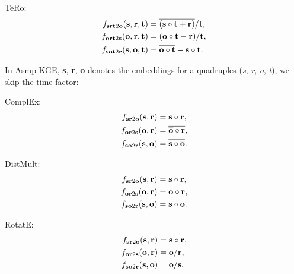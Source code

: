 \documentclass[sigconf]{acmart}
\begin{document}
\par
TeRo:
\begin{equation}
\begin{aligned}
f_{\textbf{srt} 2 \textbf{o}}(\textbf{s}, \textbf{r}, \textbf{t}) &=\overline{(\textbf{s} \circ \textbf{t} + \textbf{r})} / \textbf{t}  ,\\
f_{\textbf{ort} 2 \textbf{s}}(\textbf{o}, \textbf{r}, \textbf{t}) &=(\textbf{o} \circ \textbf{t} - \textbf{r} )/ \textbf{t}, \\
f_{\textbf{sot} 2 \textbf{r}}(\textbf{s}, \textbf{o}, \textbf{t}) &=\overline{\textbf{o} \circ \textbf{t}} - \textbf{s} \circ \textbf{t} .
\notag
\end{aligned}
\end{equation}
\par
In Asmp-KGE, \textbf{s}, \textbf{r}, \textbf{o} denotes the embeddings for a quadruples (\emph{s}, \emph{r}, \emph{o}, \emph{t}), we skip the time factor:
\par
ComplEx:
\begin{equation}
\begin{aligned}
f_{\textbf{sr} 2 \textbf{o}}(\textbf{s}, \textbf{r}) &=\textbf{s} \circ \textbf{r}, \\
f_{\textbf{or} 2 \textbf{s}}(\textbf{o}, \textbf{r}) &=\overline{\overline{\textbf{o}} \circ \textbf{r}}, \\
f_{\textbf{so} 2 \textbf{r}}(\textbf{s}, \textbf{o}) &=\overline{\textbf{s} \circ \overline{\textbf{o}}}.
\notag
\end{aligned}
\end{equation}

\par
DistMult:
\begin{equation}
\begin{aligned}
f_{\textbf{sr} 2 \textbf{o}}(\textbf{s}, \textbf{r}) &=\textbf{s} \circ \textbf{r}, \\
f_{\textbf{or} 2 \textbf{s}}(\textbf{o}, \textbf{r}) &=\textbf{o} \circ \textbf{r}, \\
f_{\textbf{so} 2 \textbf{r}}(\textbf{s}, \textbf{o}) &=\textbf{s} \circ \textbf{o}.
\notag
\end{aligned}
\end{equation}


\par
RotatE:
\begin{equation}
\begin{aligned}
f_{\textbf{sr} 2 \textbf{o}}(\textbf{s}, \textbf{r}) &=\textbf{s} \circ \textbf{r}, \\
f_{\textbf{or} 2 \textbf{s}}(\textbf{o}, \textbf{r}) &=\textbf{o} / \textbf{r}, \\
f_{\textbf{so} 2 \textbf{r}}(\textbf{s}, \textbf{o}) &=\textbf{o} / \textbf{s}.
\notag
\end{aligned}
\end{equation}
\end{document}
